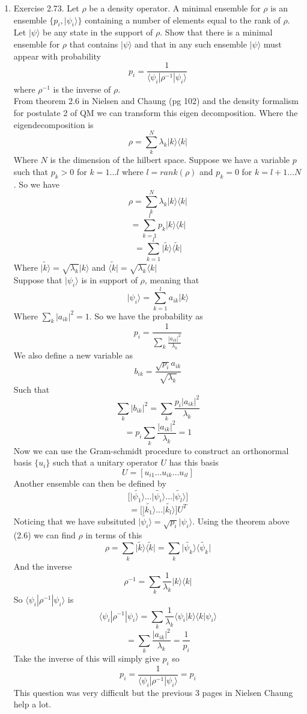 \documentclass[12pt]{article}
\newcommand{\ket}[1]{\vert{#1}\rangle}
\newcommand{\bra}[1]{\langle{#1}\vert}
\begin{document}
\begin{enumerate}
\begin{enumerate}
\end{enumerate}
\item Exercise 2.73. Let $\rho$ be a density operator. A minimal ensemble for $\rho$ is an ensemble $\{p_i, \ket{\psi_i}\}$ containing a number of elements equal to the rank of $\rho$. Let $\ket{\psi}$ be any state in the support of $\rho$. Show that there is a minimal ensemble for $\rho$ that contains $\ket{\psi}$ and that in any such ensemble $\ket{\psi}$ must appear with probability 
$$ p_i = \frac{1}{\langle \psi_i | \rho^{-1} | \psi_i \rangle} $$
where $\rho^{-1}$ is the inverse of $\rho$. \\
From theorem 2.6 in Nielsen and Chaung (pg 102) and the density formalism for postulate 2 of QM we can transform this eigen decomposition. Where the eigendecomposition is 
$$ \rho = \sum_k^N \lambda_k \ket{k}\bra{k} $$ 
Where $N$ is the dimension of the hilbert space. Suppose we have a variable $p$ such that $p_k > 0$ for $k = 1 \ldots l$ where $l = rank(\rho)$ and $p_k =0$ for $k = l+1 \ldots N$. So we have 
$$ \rho = \sum_k^N \lambda_k \ket{k}\bra{k} $$
$$ = \sum_{k=1}^l p_k \ket{k}\bra{k} $$ 
$$ = \sum_{k=1}^l \tilde{\ket{k}} \tilde{\bra{k}}$$
Where $\tilde{\ket{k}} = \sqrt{\lambda_k} \ket{k}$ and $\tilde{\bra{k}} = \sqrt{\lambda_k}\bra{k}$
\\
Suppose that $\ket{\psi_i}$ is in support of $\rho$, meaning that 
$$ \ket{\psi_i} = \sum_{k=1}^l a_{ik} \ket{k} $$ 
Where $\sum_k |a_{ik} | ^2 = 1$. So we have the probability as 
$$ p_i = \frac{1}{\sum_k \frac{|a_{ik}|^2}{\lambda_k}} $$ 
We also define a new variable as 
$$ b_{ik} = \frac{\sqrt{p_i}a_{ik}}{\sqrt{\lambda_k}}$$ 
Such that 
$$ \sum_k |b_{ik} | ^2 = \sum_k \frac{p_i |a_{ik}|^2}{\lambda_k} $$
$$ = p_i \sum_k \frac{|a_{ik}|^2}{\lambda_k} = 1 $$
Now we can use the Gram-schmidt procedure to construct an orthonormal basis $ \{ u_i \} $ such that a unitary operator $U$ has this basis 
$$ U = [u_{i1} \ldots u_{ik} \ldots u_{il}] $$
Another ensemble can then be defined by 
$$ \Big[ \tilde{\ket{\psi_1}} \ldots \tilde{\ket{\psi_i}} \ldots \tilde{\ket{\psi_l}}\Big] $$ 
$$ = \Big[ \tilde{\ket{k_1}} \ldots \tilde{\ket{k_l}}\Big] U^T $$
Noticing that we have subsituted $ \tilde{\ket{\psi_i}} = \sqrt{p_i} \ket{\psi_i} $. Using the theorem above (2.6) we can find $\rho$ in terms of this
$$ \rho = \sum_k \tilde{\ket{k}} \tilde{\bra{k}} = \sum_k \tilde{\ket{\psi_k}} \tilde{\bra{\psi_k}} $$
And the inverse 
$$ \rho^{-1} = \sum_k \frac{1}{\lambda_k} \ket{k}\bra{k} $$ 
So $ \langle \psi_i | \rho^{-1} | \psi_i \rangle $ is 
$$ \langle \psi_i | \rho^{-1} | \psi_i \rangle = \sum_k \frac{1}{\lambda_k} \langle \psi_i | k \rangle \langle k | \psi_i \rangle $$
$$ = \sum_k \frac{|a_{ik}|^2}{\lambda_k} = \frac{1}{p_i} $$
Take the inverse of this will simply give $p_i$ so 
$$ p_i = \frac{1}{\langle \psi_i | \rho^{-1} | \psi_i \rangle} = p_i $$
This question was very difficult but the previous 3 pages in Nielsen Chaung help a lot. 


\end{enumerate}
\end{document}
